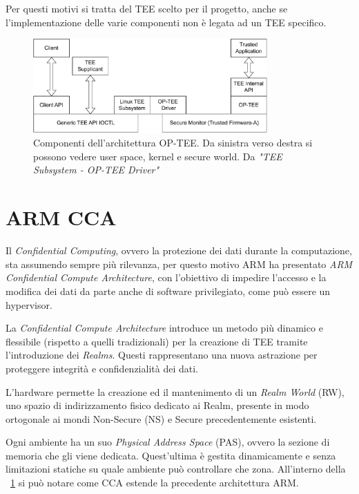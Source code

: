 \documentclass[12pt,italian]{report}
\begin{document}
	Per questi motivi si tratta del TEE scelto per il progetto, anche se l'implementazione delle varie componenti non è legata ad un TEE specifico.
	
	\begin{figure}[h]
		\centering
		\includegraphics[width=0.8\textwidth]{immagini/optee-system-architecture}
		\caption{ Componenti dell'architettura OP-TEE. Da sinistra verso destra si possono vedere user space, kernel e secure world. Da \textit{"TEE Subsystem - OP-TEE Driver"} \cite{linux_tee_subsystem} }
		\label{fig:optee-architecture}
	\end{figure}
	
	\newpage
	
	\section{ARM CCA} 
	\label{sec:cca}
	Il \textit{Confidential Computing}, ovvero la protezione dei dati durante la computazione, sta assumendo sempre più rilevanza, per questo motivo ARM ha presentato \textit{ARM Confidential Compute Architecture}, con l'obiettivo di impedire l'accesso e la modifica dei dati da parte anche di software privilegiato, come può essere un hypervisor.
	
	\bigbreak
	
	La \textit{Confidential Compute Architecture} introduce un metodo più dinamico e flessibile (rispetto a quelli tradizionali) per la creazione di TEE tramite l'introduzione dei \textit{Realms}. Questi rappresentano una nuova astrazione per proteggere integrità e confidenzialità dei dati.
	
	L'hardware permette la creazione ed il mantenimento di un \textit{Realm World} (RW), uno spazio di indirizzamento fisico dedicato ai Realm, presente in modo ortogonale ai mondi Non-Secure (NS) e Secure precedentemente esistenti. 
	
	Ogni ambiente ha un suo \textit{Physical Address Space} (PAS), ovvero la sezione di memoria che gli viene dedicata. Quest'ultima è gestita dinamicamente e senza limitazioni statiche su quale ambiente può controllare che zona. All'interno della \figurename~\ref{fig:optee-architecture} si può notare come CCA estende la precedente architettura ARM.
	
\end{document}
